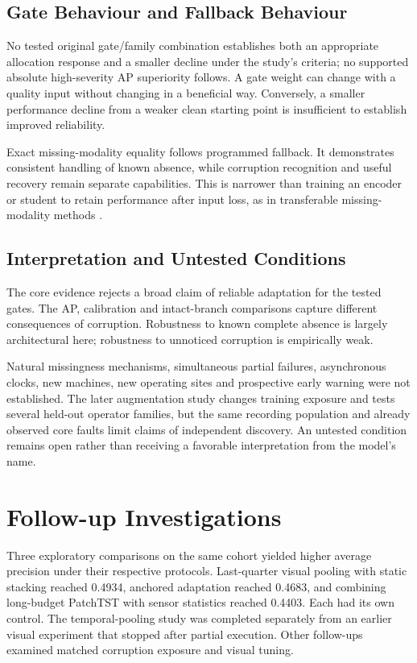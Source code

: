 \subsection{Gate Behaviour and Fallback Behaviour}
No tested original gate/family combination establishes both an appropriate allocation response and a smaller decline under the study's criteria; no supported absolute high-severity AP superiority follows. A gate weight can change with a quality input without changing in a beneficial way. Conversely, a smaller performance decline from a weaker clean starting point is insufficient to establish improved reliability.

Exact missing-modality equality follows programmed fallback. It demonstrates consistent handling of known absence, while corruption recognition and useful recovery remain separate capabilities. This is narrower than training an encoder or student to retain performance after input loss, as in transferable missing-modality methods \citep{P005,P007,P016}.

\subsection{Interpretation and Untested Conditions}
The core evidence rejects a broad claim of reliable adaptation for the tested gates. The AP, calibration and intact-branch comparisons capture different consequences of corruption. Robustness to known complete absence is largely architectural here; robustness to unnoticed corruption is empirically weak.

Natural missingness mechanisms, simultaneous partial failures, asynchronous clocks, new machines, new operating sites and prospective early warning were not established. The later augmentation study changes training exposure and tests several held-out operator families, but the same recording population and already observed core faults limit claims of independent discovery. An untested condition remains open rather than receiving a favorable interpretation from the model's name.

\section{Follow-up Investigations}
Three exploratory comparisons on the same cohort yielded higher average precision under their respective protocols. Last-quarter visual pooling with static stacking reached 0.4934, anchored adaptation reached 0.4683, and combining long-budget PatchTST with sensor statistics reached 0.4403. Each had its own control. The temporal-pooling study was completed separately from an earlier visual experiment that stopped after partial execution. Other follow-ups examined matched corruption exposure and visual tuning.

